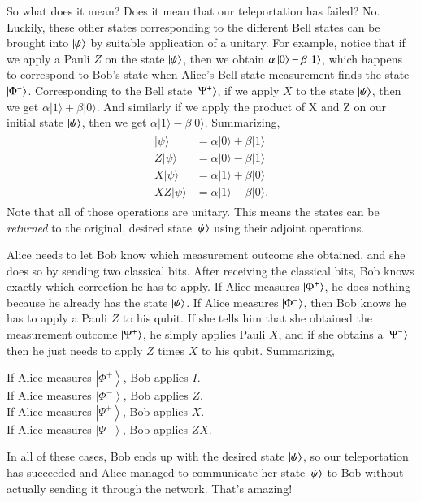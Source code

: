 So what does it mean? Does it mean that our teleportation has failed? No. Luckily, these other states corresponding to the different Bell states can be brought into $\left| \psi \right\rangle$ by suitable application of a unitary. For example, notice that if we apply a Pauli $Z$ on the state $\left| \psi \right\rangle$, then we obtain $\alpha\left| 0 \right\rangle-\beta\left| 1 \right\rangle$, which happens to correspond to Bob's state when Alice's Bell state measurement finds the state $\left| \Phi^- \right\rangle$. Corresponding to the Bell state $\left| \Psi^+ \right\rangle$, if we apply $X$ to the state $\left| \psi \right\rangle$, then we get $\alpha|1\rangle+\beta|0\rangle$. And similarly if we apply the product of X and Z on our initial state $\left| \psi \right\rangle$, then we get $\alpha|1\rangle-\beta|0\rangle$. Summarizing,
\begin{align}
\begin{aligned}
|\psi\rangle &=\alpha|0\rangle+\beta|1\rangle \\
Z|\psi\rangle &=\alpha|0\rangle-\beta|1\rangle \\
X|\psi\rangle &=\alpha|1\rangle+\beta|0\rangle \\
X Z|\psi\rangle &=\alpha|1\rangle-\beta|0\rangle.
\end{aligned}
\end{align}
Note that all of those operations are unitary.  This means the states can be \emph{returned} to the original, desired state $\left| \psi \right\rangle$ using their adjoint operations.

Alice needs to let Bob know which measurement outcome she obtained, and she does so by sending two classical bits. After receiving the classical bits, Bob knows exactly which correction he has to apply. If Alice measures $\left| \Phi^+ \right\rangle$, he does nothing because he already has the state $\left| \psi \right\rangle$. If Alice measures $\left| \Phi^- \right\rangle$, then Bob knows he has to apply a Pauli $Z$ to his qubit. If she tells him that she obtained the measurement outcome $\left| \Psi^+ \right\rangle$, he simply applies Pauli $X$, and if she obtains a $\left| \Psi^- \right\rangle$ then he just needs to apply $Z$ times $X$ to his qubit.  Summarizing,

\noindent
If Alice measures $\left|\Phi^{+}\right\rangle$, Bob applies $I$.\\
If Alice measures $\left|\Phi^{-}\right\rangle$, Bob applies $Z$.\\
If Alice measures $\left|\Psi^{+}\right\rangle$, Bob applies $X$.\\
If Alice measures $\left|\Psi^{-}\right\rangle$, Bob applies $Z X$.

In all of these cases, Bob ends up with the desired state $\left| \psi \right\rangle$, so our teleportation has succeeded and Alice managed to communicate her state $\left| \psi \right\rangle$ to Bob without actually sending it through the network. That's amazing!

